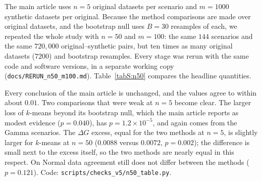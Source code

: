 \documentclass[pdflatex,referee]{sn-jnl}
\begin{document}
The main article uses $n = 5$ original datasets per scenario and $m = 1000$
synthetic datasets per original. Because the method comparisons are made over
original datasets, and the bootstrap null uses $B = 30$ resamples of each, we
repeated the whole study with $n = 50$ and $m = 100$: the same $144$ scenarios
and the same $720{,}000$ original--synthetic pairs, but ten times as many
original datasets ($7200$) and bootstrap resamples. Every stage was rerun with
the same code and software versions, in a separate working copy
(\texttt{docs/RERUN\_n50\_m100.md}). Table~\ref{tabS:n50} compares the headline
quantities.

Every conclusion of the main article is unchanged, and the values agree to
within about $0.01$. Two comparisons that were weak at $n = 5$ become clear. The
larger loss of $k$-means beyond its bootstrap null, which the main article
reports as modest evidence ($p = 0.040$), has $p = 1.2 \times 10^{-5}$, and
again comes from the Gamma scenarios. The $\Delta G$ excess, equal for the two
methods at $n = 5$, is slightly larger for $k$-means at $n = 50$ ($0.0088$
versus $0.0072$, $p = 0.002$); the difference is small next to the excess
itself, so the two methods are nearly equal in this respect. On Normal data
agreement still does not differ between the methods ($p = 0.121$). Code:
\texttt{scripts/checks\_v5/n50\_table.py}.

\begin{table}[ht]
\centering
\caption{Main results under the design of the main article ($n = 5$, $m = 1000$)
  and the replication ($n = 50$, $m = 100$), both with $B = 30$ bootstrap
  resamples per original dataset and the candidate range $\{2,\dots,8\}$. AG and
  the AG excess (over $\mathrm{AG}_0$) are at the silhouette-selected $\hat k$; the
  geometric excesses are at the planted $k$. Means of the 144 scenario-level
  means; $p$ is the Wilcoxon signed-rank test of $k$-means against Ward across
  the 144 scenarios.}
\label{tabS:n50}
\small\setlength{\tabcolsep}{2.5pt}

\end{table}

\clearpage

\end{document}
